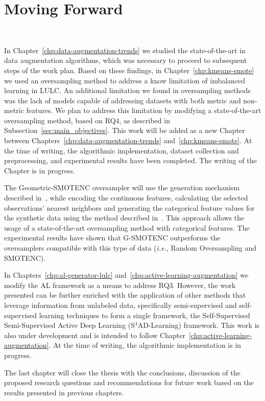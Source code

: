 \chapter{Moving Forward}~\label{chp:moving_forward}
\graphicspath{{figures/moving-forward/}}

In Chapter~\ref{chp:data-augmentation-trends} we studied the state-of-the-art
in data augmentation algorithms, which was necessary to proceed to subsequent
steps of the work plan. Based on these findings, in
Chapter~\ref{chp:kmeans-smote} we used an oversampling method to address a
know limitation of imbalanced learning in LULC\@. An additional limitation we
found in oversampling methods was the lack of models capable of addressing
datasets with both metric and non-metric features. We plan to address this
limitation by modifying a state-of-the-art oversampling method, based on RQ4,
as described in Subsection~\ref{sec:main_objectives}. This work will be added
as a new Chapter between Chapters~\ref{chp:data-augmentation-trends}
and~\ref{chp:kmeans-smote}. At the time of writing, the algorithmic
implementation, dataset collection and preprocessing, and experimental results
have been completed. The writing of the Chapter is in progress.

The Geometric-SMOTENC oversampler will use the generation mechanism described
in~\cite{Douzas2019}, while encoding the continuous features, calculating the
selected observations' nearest neighbors and generating the categorical
feature values for the synthetic data using the method described
in~\cite{Chawla2002}. This approach allows the usage of a state-of-the-art
oversampling method with categorical features. The experimental results have
shown that G-SMOTENC outperforms the oversamplers compatible with this
type of data (\textit{i.e.}, Random Oversampling and SMOTENC).

In Chapters~\ref{chp:al-generator-lulc}
and~\ref{chp:active-learning-augmentation} we modify the AL framework as a
means to address RQ3. However, the work presented can be further enriched with
the application of other methods that leverage information from unlabeled
data, specifically semi-supervised and self-supervised learning techniques to
form a single framework, the Self-Supervised Semi-Supervised Active Deep
Learning (S$^4$AD-Learning) framework.
This work is also under development and is intended to follow
Chapter~\ref{chp:active-learning-augmentation}. At the time of writing, the
algorithmic implementation is in progress.

The last chapter will close the thesis with the conclusions, discussion of the
proposed research questions and recommendations for future work based on the
results presented in previous chapters.
